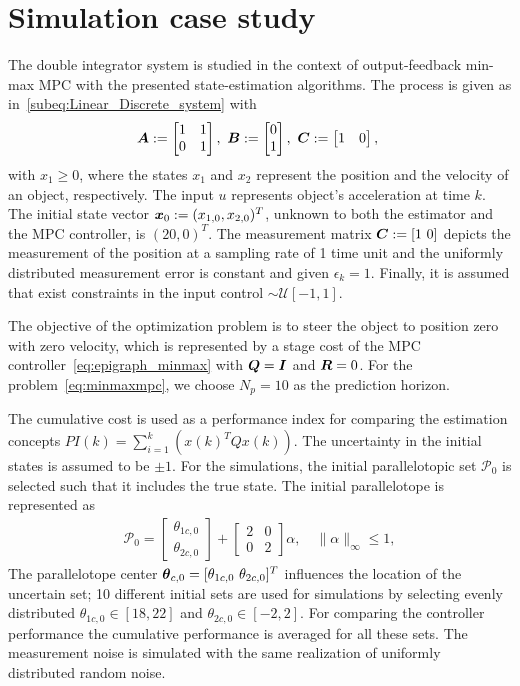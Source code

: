 \documentclass{ifacconf}
\def\ve#1{\mathchoice{\mbox{\boldmath$\displaystyle#1$}}
{\mbox{\boldmath$\textstyle#1$}}
{\mbox{\boldmath$\scriptstyle#1$}}
{\mbox{\boldmath$\scriptscriptstyle#1$}}}
\begin{document}
\section{Simulation case study}\label{sec:casstu}
The double integrator system is studied in the context of output-feedback min-max MPC with the presented state-estimation algorithms. The process is given as in~\eqref{subeq:Linear_Discrete_system} with
\begin{align}
\ve A := \begin{bmatrix} 1 & 1 \\ 0 & 1 \end{bmatrix}, \
\ve B := \begin{bmatrix} 0\\ 1 \end{bmatrix},\
\ve C := \begin{bmatrix} 1 & 0 \end{bmatrix},\
\end{align}
with $x_{1} \geq 0$, where the states $x_1$ and $x_2$ represent the position and the velocity of an object, respectively. The input $u$ represents object's acceleration at time $k$. The initial state vector $\ve x_0 := (x_{1,0},x_{2,0})^T$, unknown to both the estimator and the MPC controller, is $(20 , 0)^T$. The measurement matrix $\ve C := [1 \ 0]$ depicts the measurement of the position at a sampling rate of 1 time unit and the uniformly distributed measurement error is constant and given $\epsilon_{k}=1$. Finally, it is assumed that exist constraints in the input control $\sim \mathcal U[-1,1]$.

The objective of the optimization problem is to steer the object to position zero with zero velocity, which is represented by a stage cost of the MPC controller~\eqref{eq:epigraph_minmax} with $\ve Q=\ve I$ and $\ve R=0$. For the problem~\eqref{eq:minmaxmpc}, we choose $N_p = 10$ as the prediction horizon.

The cumulative cost is used as a performance index for comparing the estimation concepts
$PI(k) = \sum_{i=1}^{k}(x(k)^{T}Qx(k))$. The uncertainty in the initial states is assumed to be $\pm 1$. For the simulations, the initial parallelotopic set $\mathcal{P}_0$ is selected such that it includes the true state. The initial parallelotope is represented as
\begin{align}
\mathcal{P}_0 = 
  \begin{bmatrix} \theta_{1c,0} \\ \theta_{2c,0} \end{bmatrix}
  + \begin{bmatrix} 2 & 0\\ 0 & 2 \end{bmatrix}
  \alpha, \quad \|\alpha\|_\infty \leq 1,
\end{align}
The parallelotope center  $\ve\theta_{c,0} = [\theta_{1c,0} \ \theta_{2c,0}]^T$ influences the location of the uncertain set; 10 different initial sets are used for simulations by selecting evenly distributed $\theta_{1c,0} \in [18,22]$ and $\theta_{2c,0} \in [-2,2]$. For comparing the controller performance the cumulative performance is averaged for all these sets. The measurement noise is simulated with the same realization of uniformly distributed random noise.
\end{document}
